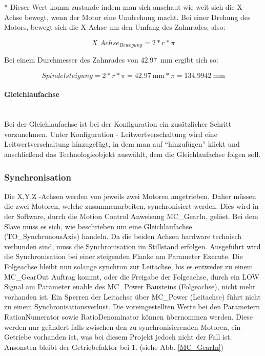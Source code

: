 * Dieser Wert komm zustande indem man sich anschaut wie weit sich die X-Achse bewegt, wenn der Motor eine Umdrehung macht. Bei einer Drehung des Motors, bewegt sich die X-Achse um den Umfang des Zahnrades, also:

\vspace{-6mm}
        \begin{equation*}
          X\_Achse_{Bewegung} = 2 * r * \pi
        \end{equation*}
        
Bei einem Durchmesser des Zahnrades von \qty{42,97}{\milli\meter} ergibt sich so:

\vspace{-6mm}
        \begin{equation*}
            Spindelsteigung = 2 * r * \pi = \qty{42,97}{\milli\meter}  * \pi = \qty{134,9942}{\milli\meter} 
        \end{equation*}

\paragraph{Gleichlaufachse} \mbox{} \\
Bei der Gleichlaufachse ist bei der Konfiguration ein zusätzlicher Schritt vorzunehmen. Unter Konfiguration - Leitwertverschaltung wird eine Leitwertverschaltung hinzugefügt, in dem man auf \enquote{hinzufügen} klickt und anschließend das Technologieobjekt auswählt, dem die Gleichlaufachse folgen soll.



\subsubsection{Synchronisation}
Die X,Y,Z -Achsen werden von jeweils zwei Motoren angetrieben. Daher müssen die zwei Motoren, welche zusammenarbeiten, synchronisiert werden. Dies wird in der Software, durch die Motion Control Anweisung MC\_GearIn, gelöst. Bei dem Slave muss es sich, wie beschrieben um eine Gleichlaufachse (TO\_SynchronousAxis) handeln. Da die beiden Achsen hardware technisch verbunden sind, muss die Synchronisation im Stillstand erfolgen. Ausgeführt wird die Synchronisation bei einer steigenden Flanke am Parameter Execute. Die Folgeachse bleibt nun solange synchron zur Leitachse, bis es entweder zu einem MC\_GearOut Auftrag kommt, oder die Freigabe der Folgeachse, durch ein LOW Signal am Parameter enable des MC\_Power Bausteins (Folgeachse), nicht mehr vorhanden ist. Ein Sperren der Leitachse über MC\_Power (Leitachse) führt nicht zu einem Synchronisationsverlust. Die voreingestellten Werte bei den Parametern RationNumerator sowie RatioDenominator können übernommen werden. Diese werden nur geändert falls zwischen den zu synchronisierenden Motoren, ein Getriebe vorhanden ist, was bei diesem Projekt jedoch nicht der Fall ist. Ansonsten bleibt der Getriebefaktor bei 1. (siehe Abb. \ref{MC_GearIn})

